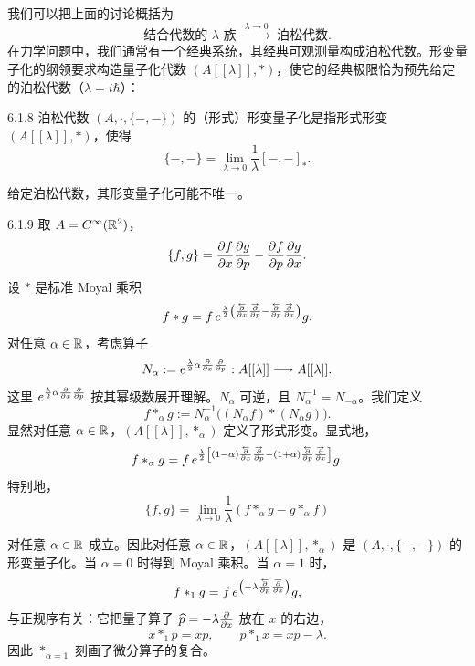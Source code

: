 我们可以把上面的讨论概括为
\[
\text{结合代数的 }\lambda\text{ 族}\ \xrightarrow{\ \lambda\to0\ }\ \text{泊松代数}.
\]
在力学问题中，我们通常有一个经典系统，其经典可观测量构成泊松代数。形变量子化的纲领要求构造量子化代数 $(A[[\lambda]],*)$，使它的经典极限恰为预先给定的泊松代数（$\lambda=i\hbar$）：
\begin{center}
\end{center}

\begin{definition}{6.1.8}
  泊松代数 $(A,\cdot,\{-,-\})$ 的（形式）形变量子化是指形式形变 $(A[[\lambda]],*)$，使得
  \[
  \{-,-\}=\lim_{\lambda\to0}\frac{1}{\lambda}[-, -]_*.
  \]
\end{definition}

给定泊松代数，其形变量子化可能不唯一。

\begin{example}{6.1.9}
  取 $A=C^\infty(\mathbb{R}^2)$，
  \[
  \{f,g\}=\frac{\partial f}{\partial x}\frac{\partial g}{\partial p}-\frac{\partial f}{\partial p}\frac{\partial g}{\partial x}.
  \]
  设 $*$ 是标准 Moyal 乘积
  \[
  f*g=f\,e^{\frac{\lambda}{2}\left(
  \frac{\overleftarrow{\partial}}{\partial x}\frac{\overrightarrow{\partial}}{\partial p}
  -\frac{\overleftarrow{\partial}}{\partial p}\frac{\overrightarrow{\partial}}{\partial x}\right)}g.
  \]
  对任意 $\alpha\in\mathbb{R}$，考虑算子
  \[
  N_\alpha:=e^{\frac{\lambda}{2}\alpha\frac{\partial}{\partial x}\frac{\partial}{\partial p}}:
  A[[\lambda]]\longrightarrow A[[\lambda]].
  \]
  这里 $e^{\frac{\lambda}{2}\alpha\frac{\partial}{\partial x}\frac{\partial}{\partial p}}$ 按其幂级数展开理解。$N_\alpha$ 可逆，且 $N_\alpha^{-1}=N_{-\alpha}$。我们定义
  \[
  f*_\alpha g:=N_\alpha^{-1}\big((N_\alpha f)*(N_\alpha g)\big).
  \]
  显然对任意 $\alpha\in\mathbb{R}$，$(A[[\lambda]],*_\alpha)$ 定义了形式形变。显式地，
  \[
  f*_\alpha g=f\,e^{\frac{\lambda}{2}\left[
  (1-\alpha)\frac{\overleftarrow{\partial}}{\partial x}\frac{\overrightarrow{\partial}}{\partial p}
  -(1+\alpha)\frac{\overleftarrow{\partial}}{\partial p}\frac{\overrightarrow{\partial}}{\partial x}\right]}g.
  \]
  特别地，
  \[
  \{f,g\}=\lim_{\lambda\to0}\frac{1}{\lambda}(f*_\alpha g-g*_\alpha f)
  \]

  对任意 $\alpha\in\mathbb{R}$ 成立。因此对任意 $\alpha\in\mathbb{R}$，$(A[[\lambda]],*_\alpha)$ 是 $(A,\cdot,\{-,-\})$ 的形变量子化。当 $\alpha=0$ 时得到 Moyal 乘积。当 $\alpha=1$ 时，
  \[
  f*_1g=f\,e^{\left(-\lambda\frac{\overleftarrow{\partial}}{\partial p}
  \frac{\overrightarrow{\partial}}{\partial x}\right)}g,
  \]
  与正规序有关：它把量子算子 $\widehat{p}=-\lambda\frac{\partial}{\partial x}$ 放在 $x$ 的右边，
  \[
  x*_1p=xp,\qquad p*_1x=xp-\lambda.
  \]
  因此 $*_{\alpha=1}$ 刻画了微分算子的复合。
\end{example}

